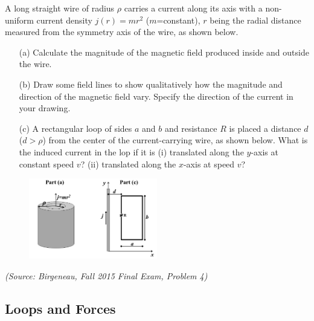 \documentclass{article}
\begin{document}
A long straight wire of radius $\rho$ carries a current along its axis with a non-uniform current density $j(r)=mr^2$ ($m$=constant), $r$ being the radial distance measured from the symmetry axis of the wire, as shown below.
\begin{itemize}
	\item[(a)] Calculate the magnitude of the magnetic field produced inside and outside the wire.
	\item[(b)] Draw some field lines to show qualitatively how the magnitude and direction of the magnetic field vary. Specify the direction of the current in your drawing.
	\item[(c)] A rectangular loop of sides $a$ and $b$ and resistance $R$ is placed a distance $d$ ($d>\rho$) from the center of the current-carrying wire, as shown below. What is the induced current in the lop if it is (i) translated along the $y$-axis at constant speed $v$? (ii) translated along the $x$-axis at speed $v$?
\end{itemize}
\begin{figure}[h]
\begin{center}
	\includegraphics[width=0.5\textwidth]{cylinderinduced.png}
\end{center}
\end{figure}

\textit{(Source: Birgeneau, Fall 2015 Final Exam, Problem 4)}

\subsection{Loops and Forces}
\end{document}
